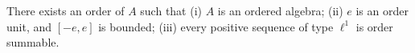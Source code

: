 There exists an order of $A$ such that (i) $A$ is an ordered algebra; (ii) $e$ is an order unit, and $[-e, e]$ is bounded; (iii) every positive sequence of type $\ell^1$ is order summable.
